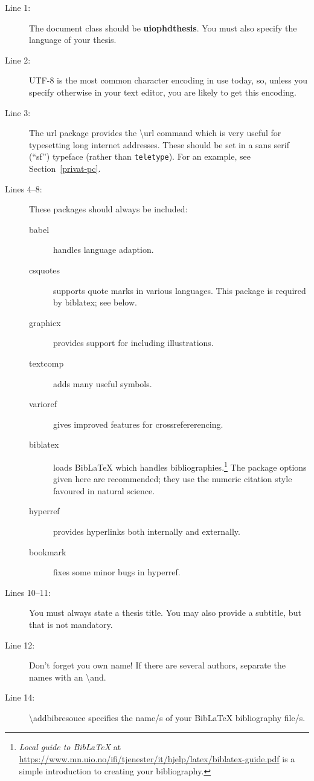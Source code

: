 \documentclass[UKenglish]{uiophdthesis}
\newcommand{\bsl}{\textbackslash}
\newcommand{\p}[1]{\textsf{#1}}
\newcommand{\pb}[1]{\textbf{\p{#1}}}
\newcommand{\pcmd}[1]{\p{\bsl #1}}
\begin{document}
\begin{description}
\item[Line 1:] The document class should be \pb{uiophdthesis}. You must
  also specify the language of your thesis.
\item[Line 2:] UTF-8 is the most common character encoding in use
  today, so, unless you specify otherwise in your text editor, you are
  likely to get this encoding.
\item[Line 3:] The \p{url} package provides the \pcmd{url}
  command which is very useful for typesetting long internet
  addresses. These should be set in a \textsf{sans serif} (``sf'') typeface
  (rather than \texttt{teletype}). For an example, see
  Section~\vref{privat-pc}.
\item[Lines 4--8:] These packages should always be included:
  \begin{description}
  \item[\p{babel}] handles language adaption.
  \item[\p{csquotes}] supports quote marks in various languages. This
    package is required by \p{biblatex}; see below.
  \item[\p{graphicx}] provides support for including illustrations.
  \item[\p{textcomp}] adds many useful symbols.
  \item[\p{varioref}] gives improved features for crossrefererencing.
  \item[\p{biblatex}] loads Bib\LaTeX{} which handles
    bibliographies.\footnote{\emph{Local guide to Bib\LaTeX} at
      \url{https://www.mn.uio.no/ifi/tjenester/it/hjelp/latex/biblatex-guide.pdf}
      is a simple introduction to creating your bibliography.}
    The package options given here are recommended; they use the
    numeric citation style favoured in natural science.
  \item[\p{hyperref}] provides hyperlinks both internally and externally.
  \item[\p{bookmark}] fixes some minor bugs in \p{hyperref}.
  \end{description}

\item[Lines 10--11:] You must always state a thesis title. You may also
  provide a subtitle, but that is not mandatory.
\item[Line 12:] Don't forget you own name! If there are several
  authors, separate the names with an \pcmd{and}.

\item [Line 14:] \pcmd{addbibresouce} specifies the name/s of your Bib\LaTeX{}
  bibliography file/s.


\end{description}
\end{document}
